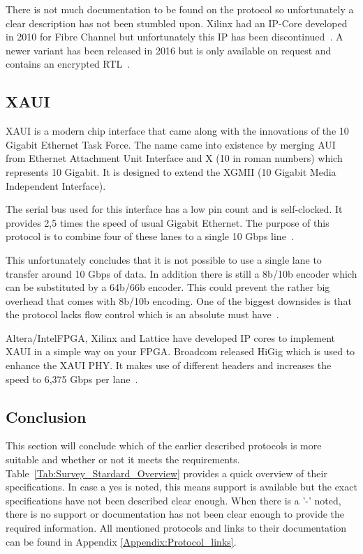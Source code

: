 	There is not much documentation to be found on the protocol so unfortunately a clear description has not been stumbled upon.
	Xilinx had an IP-Core developed in 2010 for Fibre Channel but unfortunately this IP has been discontinued~\cite{FC_Xilinx}. A newer variant has been released in 2016 but is only available on request and contains an encrypted RTL~\cite{FC_Xilinx32G}.


\subsection{XAUI}
	XAUI is a modern chip interface that came along with the innovations of the 10 Gigabit Ethernet Task Force. The name came into existence by merging AUI from Ethernet Attachment Unit Interface and X (10 in roman numbers) which represents 10 Gigabit. It is designed to extend the XGMII (10 Gigabit Media Independent Interface).
	
	The serial bus used for this interface has a low pin count and is self-clocked. It provides 2,5 times the speed of usual Gigabit Ethernet. The purpose of this protocol is to combine four of these lanes to a single 10 Gbps line~\cite{XAUI_10gea}.
	
	This unfortunately concludes that it is not possible to use a single lane to transfer around 10 Gbps of data. In addition there is still a 8b/10b encoder which can be substituted by a 64b/66b encoder. This could prevent the rather big overhead that comes with 8b/10b encoding. One of the biggest downsides is that the protocol lacks flow control which is an absolute must have~\cite{XAUI_AT}.
	
	Altera/IntelFPGA, Xilinx and Lattice have developed IP cores to implement XAUI in a simple way on your FPGA. Broadcom released HiGig which is used to enhance the XAUI PHY. It makes use of different headers and increases the speed to 6,375 Gbps per lane~\cite{HiGig}.



\subsection{Conclusion}
	This section will conclude which of the earlier described protocols is more suitable and whether or not it meets the requirements. Table~\ref{Tab:Survey_Stardard_Overview} provides a quick overview of their specifications. In case a yes is noted, this means support is available but the exact specifications have not been described clear enough. When there is a '-' noted, there is no support or documentation has not been clear enough to provide the required information. 
	All mentioned protocols and links to their documentation can be found in Appendix \ref{Appendix:Protocol_links}.
	
